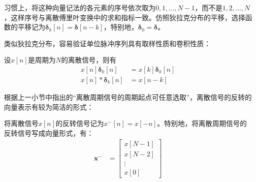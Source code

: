 \documentclass{ctexbook}
\begin{document}
习惯上，将这种向量记法的各元素的序号依次取为$0,1,\dots,N-1$，而不是$1,2,\dots,N$，这样序号与离散傅里叶变换中的求和指标一致。仿照狄拉克分布的平移，选择函数的平移记为$\boldsymbol{\delta}_k[n]=\boldsymbol{\delta}[n-k]$，特别地，$\boldsymbol{\delta}_0=\boldsymbol{\delta}$。

类似狄拉克分布，容易验证单位脉冲序列具有取样性质和卷积性质：
\begin{proposition}
    设$x[n]$是周期为$N$的离散信号，则有
    \begin{align*}
        x[n]\boldsymbol{\delta}_k[n]&=x[k]\boldsymbol{\delta}_k[n]\\
        x[n]*\boldsymbol{\delta}_k[n]&=x[n-k]
    \end{align*}
\end{proposition}

根据上一小节中指出的“离散周期信号的周期起点可任意选取”，离散信号的反转的向量表示有较为简洁的形式：

\begin{definition}[离散信号的反转]
    将离散信号$x[n]$的反转信号记为$x^-[n]=x[-n]$。特别地，将离散周期信号的反转信号写成向量形式，有：
    \begin{align*}
    \textbf{x}^-&=\begin{bmatrix}
x[N-1]  \\
x[N-2]  \\
\vdots \\
x[0]
\end{bmatrix}\end{align*}
\end{definition}
\end{document}
